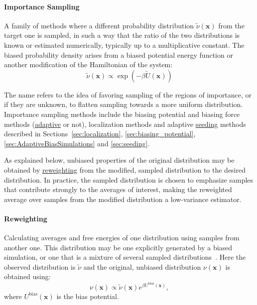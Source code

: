 \documentclass[9pt,review]{livecoms}
\newcommand{\vx}{\mathbf{x}}
\begin{document}
\hypertarget{ref:IS} {\paragraph{Importance Sampling}}
\label{sec:importance_sampling} A family of methods where a different probability distribution $\tilde\nu(\vx)$ from the target one is sampled, in such a way that the ratio of the two distributions is known or estimated numerically, typically up to a multiplicative constant.
The biased probability density arises from a biased potential energy function or another modification of the Hamiltonian of the system:
\begin{equation}
\tilde \nu(\vx) \propto \exp(-\beta \tilde U(\vx))
\end{equation}

The name refers to the idea of favoring sampling of the regions of importance, or if they are unknown, to flatten sampling towards a more uniform distribution.
Importance sampling methods include the biasing potential and biasing force methods (\hyperlink{ref:Adaptive} {adaptive} or not), localization methods and adaptive \hyperlink{ref:Seeding} {seeding} methods described in Sections~\ref{sec:localization}, \ref{sec:biasing_potential}, \ref{sec:AdaptiveBiasSimulations} and \ref{sec:seeding}.

As explained below, unbiased properties of the original distribution may be obtained by \hyperlink{ref:Reweighting} {reweighting} from the modified, sampled distribution to the desired distribution.
In practice, the  sampled distribution is chosen to emphasize samples that contribute strongly to the averages of interest, making the reweighted average over samples from the modified distribution a low-variance estimator.


\hypertarget{ref:Reweighting} {\paragraph{Reweighting}}
Calculating averages and free energies of one distribution using samples from another one. This distribution may be one explicitly generated by a biased simulation, or one that is a mixture of several sampled distributions~\cite{reweighting_mixture_distribution}.
Here the observed distribution is $\tilde \nu$ and the original, unbiased distribution $\nu(\vx)$ is obtained using:
\begin{equation}
\nu(\vx) \propto \tilde\nu(\vx) e^{\beta U^\mathrm{bias}(\vx)},
\end{equation}
where $U^\mathrm{bias}(\vx)$ is the bias potential.
\end{document}
